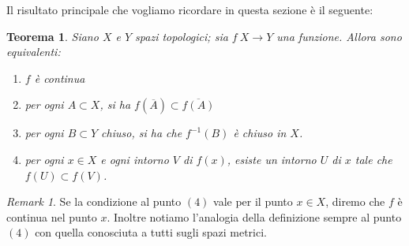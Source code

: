 \documentclass[10pt,a4paper]{article}
\theoremstyle{definition}
\theoremstyle{plain}
\newtheorem{teo}{Teorema}
\theoremstyle{remark}
\newtheorem{rem}{Remark}
\theoremstyle{remark}
\begin{document}
Il risultato principale che vogliamo ricordare in questa sezione è il seguente:
\begin{teo}\label{CondequivCont} Siano $X$ e $Y$ spazi topologici; sia $f \: X \to Y$ una funzione. Allora sono equivalenti:
\begin{enumerate}
\item $f$ è continua
\item per ogni $A \subset X$, si ha $f(\overline{A}) \subset \overline{f(A)}$
\item per ogni $B \subset Y$ chiuso, si ha che $f^{-1}(B)$ è chiuso in $X$.
\item per ogni $x \in X$  e ogni intorno $V$ di $f(x)$, esiste un intorno $U$ di $x$ tale che $f(U) \subset f(V)$.
\end{enumerate}

\end{teo}

\begin{rem} Se la condizione al punto $(4)$ vale per il punto $x \in X$, diremo che $f$ è continua nel punto $x$. Inoltre notiamo l'analogia della definizione sempre al punto $(4)$ con quella conosciuta a tutti sugli spazi metrici.
\end{rem}
\end{document}
